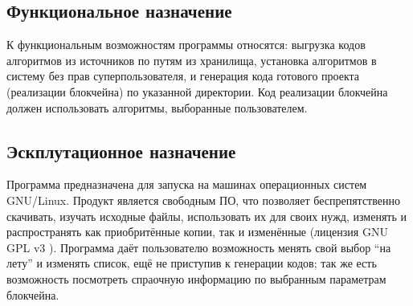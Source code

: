 \subsection{Функциональное назначение}
К функциональным возможностям программы относятся:
выгрузка кодов алгоритмов из источников по путям из хранилища, установка
алгоритмов в систему без прав суперпользователя, и генерация кода готового
проекта (реализации блокчейна) по указанной директории. Код реализации
блокчейна должен использовать алгоритмы, выборанные пользователем.

\subsection{Эскплутационное назначение}
Программа предназначена для запуска на машинах операционных систем GNU/Linux.
Продукт является свободным ПО, что позволяет беспрепятственно скачивать,
изучать исходные файлы, использовать их для своих нужд, изменять и
распространять как приобритённые копии, так и изменённые (лицензия GNU GPL v3
\cite{gnu}).
Программа даёт пользователю возможность менять свой выбор ``на лету'' и
изменять список, ещё не приступив к генерации кодов; так же есть возможность
посмотреть спраочную информацию по выбранным параметрам блокчейна.


